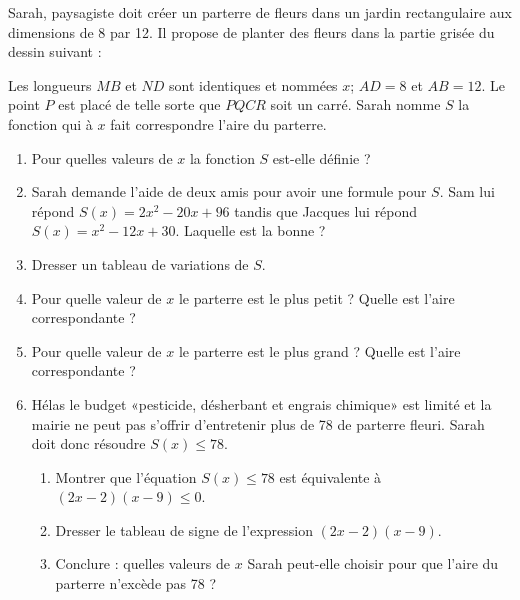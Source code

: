 
\begin{exercice}[\ldots/4]\label{exosmath-0715}

    \begin{multicols}{2}

    Sarah, paysagiste doit créer un parterre de fleurs dans un jardin rectangulaire aux dimensions de \unit{8}{\meter} par \unit{12}{\meter}. Il propose de planter des fleurs dans la partie grisée du dessin suivant :

\begin{center}
   
\end{center}

Les longueurs \( MB\) et \( ND\) sont identiques et nommées \( x\); \( AD=8\) et \( AB=12\). Le point \( P\) est placé de telle sorte que \( PQCR\) soit un carré. Sarah nomme \( S\) la fonction qui à \( x\) fait correspondre l'aire du parterre.

\begin{enumerate}
    \item
        Pour quelles valeurs de \( x\) la fonction \( S\) est-elle définie ?
    \item
        Sarah demande l'aide de deux amis pour avoir une formule pour \( S\). Sam lui répond \( S(x)=2x^2-20x+96\) tandis que Jacques lui répond \( S(x)=x^2-12x+30\). Laquelle est la bonne ?
            \item
                Dresser un tableau de variations de \( S\).
            \item
                Pour quelle valeur de \( x\) le parterre est le plus petit ? Quelle est l'aire correspondante ?
            \item
                Pour quelle valeur de \( x\) le parterre est le plus grand ? Quelle est l'aire correspondante ?
    \item
        Hélas le budget «pesticide, désherbant et engrais chimique» est limité et la mairie ne peut pas s'offrir d'entretenir plus de \unit{78}{\squared\meter} de parterre fleuri. Sarah doit donc résoudre \( S(x)\leq 78\).
        \begin{enumerate}
            \item
                Montrer que l'équation \( S(x)\leq 78\) est équivalente à \( (2x-2)(x-9)\leq 0\).
            \item
                Dresser le tableau de signe de l'expression \( (2x-2)(x-9)\).
            \item
                Conclure : quelles valeurs de \( x\) Sarah peut-elle choisir pour que l'aire du parterre n'excède pas \unit{78}{\squared\meter} ?
        \end{enumerate}
\end{enumerate}
    \end{multicols}

\end{exercice}

